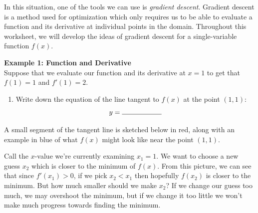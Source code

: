 \documentclass[11pt]{article}
\begin{document}
In this situation, one of the tools we can use is \textit{gradient descent}. Gradient descent is a method used for optimization which only requires us to be able to evaluate a function and its derivative at individual points in the domain. Throughout this worksheet, we will develop the ideas of gradient descent for a single-variable function $f(x)$.

{\bf Example 1: Function and Derivative}\\

Suppose that we evaluate our function and its derivative at $x=1$ to get that $f(1) = 1$ and $f'(1) = 2$.

\begin{enumerate}
\item Write down the equation of the line tangent to $f(x)$ at the point $(1,1)$:
\[
    y = \rule{2cm}{0.4pt}
\]
\end{enumerate}

A small segment of the tangent line is sketched below in red, along with an example in blue of what $f(x)$ might look like near the point $(1,1)$.

\begin{center}
\end{center}

Call the $x$-value we're currently examining $x_1=1$. We want to choose a new guess $x_2$ which is closer to the minimum of $f(x)$.
From this picture, we can see that since $f'(x_1)>0$, if we pick $x_2 < x_1$ then hopefully  $f(x_2)$ is closer to the minimum. But how much smaller should we make $x_2$? If we change our guess too much, we may overshoot the minimum, but if we change it too little we won't make much progress towards finding the minimum. 
\end{document}
